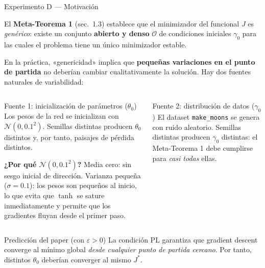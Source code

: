 \documentclass[10pt]{beamer}
\begin{document}
\begin{frame}{Experimento D — Motivación}

El \textbf{Meta-Teorema 1} (sec.\ 1.3) establece que el minimizador del funcional $J$ es \emph{genérico}: existe un conjunto \textbf{abierto y denso} $\mathcal{O}$ de condiciones iniciales $\gamma_0$ para las cuales el problema tiene un único minimizador estable.

\medskip
En la práctica, «genericidad» implica que \textbf{pequeñas variaciones en el punto de partida} no deberían cambiar cualitativamente la solución. Hay dos fuentes naturales de variabilidad:

\begin{columns}
\begin{block}{Fuente 1: inicialización de parámetros ($\theta_0$)}
  Los pesos de la red se inicializan con $\mathcal{N}(0, 0.1^2)$. Semillas distintas producen $\theta_0$ distintos y, por tanto, paisajes de pérdida distintos.

  \smallskip
  {\footnotesize\textbf{¿Por qué $\mathcal{N}(0,0.1^2)$?} Media cero: sin sesgo inicial de dirección. Varianza pequeña ($\sigma=0.1$): los pesos son pequeños al inicio, lo que evita que $\tanh$ se sature inmediatamente y permite que los gradientes fluyan desde el primer paso.}
\end{block}

\begin{block}{Fuente 2: distribución de datos ($\gamma_0$)}
  El dataset \texttt{make\_moons} se genera con ruido aleatorio. Semillas distintas producen $\gamma_0$ distintas: el Meta-Teorema 1 debe cumplirse para \emph{casi todas} ellas.
\end{block}
\end{columns}

\bigskip
\begin{alertblock}{Predicción del paper (con $\varepsilon > 0$)}
  La condición PL garantiza que gradient descent converge al mínimo global \emph{desde cualquier punto de partida cercano}. Por tanto, distintos $\theta_0$ deberían converger al mismo $J^*$.
\end{alertblock}

\end{frame}
\end{document}
